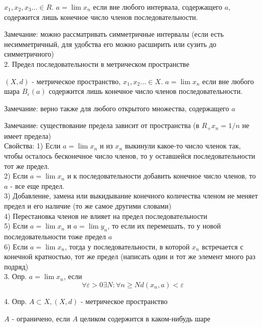 \documentclass[12pt]{article}
\begin{document}
$x_1, x_2, x_3 ... \in R$. $a=\lim x_n$ если вне любого интервала, содержащего $a$, содержится лишь конечное число членов последовательности.

Замечание: можно рассматривать симметричные интервалы (если есть несимметричный, для удобства его можно расширить или сузить до симметричного)\\

2. Предел последовательности в метрическом пространстве

$(X, d)$ - метрическое пространство, $x_1, x_2 ... \in X$. $a=\lim x_n$ если вне любого шара $B_\varepsilon (a)$ содержится лишь конечное число членов последовательности.

Замечание: верно также для любого открытого множества, содержащего $a$

Замечание: существование предела зависит от пространства (в $R_+ x_n = 1/n$ не имеет предела)\\

Свойства:
1) Если $a=\lim x_n$ и из $x_n$ выкинули какое-то число членок так, чтобы осталось бесконечное число членов, то у оставшейся последовательности тот же предел.\\

2) Если $a=\lim x_n$ и к последовательности добавить конечное число членов, то $a$ - все еще предел.\\

3) Добавление, замена или выкидывание конечного количества членом не меняет предел и его наличие (то же самое другими словами)\\

4) Перестановка членов не влияет на предел последовательности\\

5) Если $a=\lim x_n$ и $a=\lim y_n$, то если их перемешать, то у новой последовательности тоже предел $a$\\

6) Если $a=\lim x_n$, тогда у последовательности, в которой $x_n$ встречается с конечной кратностью, тот же предел (написать один и тот же элемент много раз подряд)\\

3. Опр. $a=\lim x_n$, если
\[ \forall \varepsilon>0 \exists N : \forall n\geq N d(x_n, a)<\varepsilon\]

4. Опр. $A \subset X, (X, d)$ - метрическое пространство

$A$ - ограничено, если $A$ целиком содержится в каком-нибудь шаре\\
\end{document}
